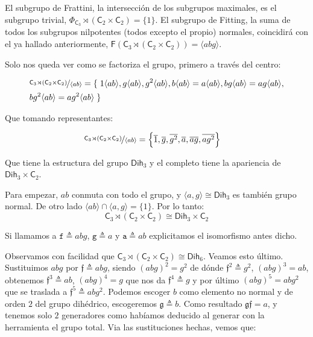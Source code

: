 \documentclass[12pt,a4paper,fleqn,spanish,final,openright]{extbook}
\theoremstyle{definition}
\theoremstyle{remark}
\begin{document}
El subgrupo de Frattini, la intersección de los subgrupos maximales, es el subgrupo trivial, ${\Phi }_{\mathsf{C}_{3}}\rtimes{\left({\mathsf{C}_{2}}   \times   {\mathsf{C}_{2}}\right)}= \lbrace 1\rbrace$. El subgrupo de Fitting, la suma de todos los subgrupos nilpotentes (todos excepto el propio) normales, coincidirá con el ya hallado anteriormente, $\mathsf{F}\left(\mathsf{C}_{3}\rtimes\left({\mathsf{C}_{2}}   \times   {\mathsf{C}_{2}}\right)\right)=\langle abg \rangle$.

Solo nos queda ver como se factoriza el grupo, primero a través del centro:

\begin{align*}
&
\nicefrac
{\mathsf{C}_{3}\rtimes\left({\mathsf{C}_{2}}   \times   {\mathsf{C}_{2}}\right)}
{\left\langle ab \right\rangle}
=
\left\lbrace\right.
1{\left\langle{ab}\right\rangle},
g{\left\langle{ab}\right\rangle},
g^2{\left\langle{ab}\right\rangle},
b{\left\langle{ab}\right\rangle}=
a{\left\langle{ab}\right\rangle},
bg{\left\langle{ab}\right\rangle}
=
ag{\left\langle{ab}\right\rangle},\\
&
bg^2{\left\langle{ab}\right\rangle}
=
ag^2{\left\langle{ab}\right\rangle}
\left.\right\rbrace
\end{align*}

Que tomando representantes:

\begin{align*}
&
\nicefrac
{\mathsf{C}_{3}\rtimes\left({\mathsf{C}_{2}}   \times   {\mathsf{C}_{2}}\right)}
{\left\langle ab \right\rangle}
=
\left\lbrace
\overline{1},
\overline{g},
\overline{g^2},
\overline{a},
\overline{ag},
\overline{ag^2}
\right\rbrace
\end{align*}

Que tiene la estructura del grupo $\mathsf{Dih}_{3}$ y el completo tiene la apariencia de $\mathsf{Dih}_{3}   \times   \mathsf{C}_{2}$.

Para empezar, $ab$ conmuta con todo el grupo, y $\langle a,g \rangle   \cong   \mathsf{Dih}_{3}$ es también grupo normal. De otro lado $\langle ab\rangle    \cap \langle a,g \rangle = \lbrace 1 \rbrace$. Por lo tanto:
\[
{\mathsf{C}_{3}\rtimes\left({\mathsf{C}_{2}   \times   \mathsf{C}_{2}}\right)}   \cong   {\mathsf{Dih}_{3}   \times   \mathsf{C}_{2}}
\]

Si llamamos a $\mathtt{f}\triangleq abg$, $\mathtt{g}\triangleq a$ y $\mathtt{a} \triangleq ab$ explicitamos el isomorfismo antes dicho.

Observamos con facilidad que ${\mathsf{C}_{3}}\rtimes{\left({{\mathsf{C}_{2}}   \times   {\mathsf{C}_{2}}}\right)}   \cong   \mathsf{Dih}_{6}$. Veamos esto último. Sustituimos $abg$ por $\mathfrak{f}\triangleq abg$, siendo $(abg)^2 = g^2$ de dónde  $\mathfrak{f}^{2}\triangleq g^2$, ${(abg)}^{3}=ab$, obtenemos $\mathfrak{f}^{3}\triangleq ab$, $(abg)^{4}= g$ que nos da $\mathfrak{f}^{4}\triangleq g$ y por último $(abg)^{5}= abg^2$ que se traslada a $\mathfrak{f}^{5}\triangleq abg^2$.  Podemos escoger $b$ como elemento no normal y de orden $2$ del grupo dihédrico, escogeremos $\mathfrak{g}\triangleq b$. Como resultado $\mathfrak{gf}=a$, y tenemos solo $2$ generadores como habíamos deducido al generar con la herramienta el grupo total. Via las sustituciones hechas, vemos que:
\end{document}
